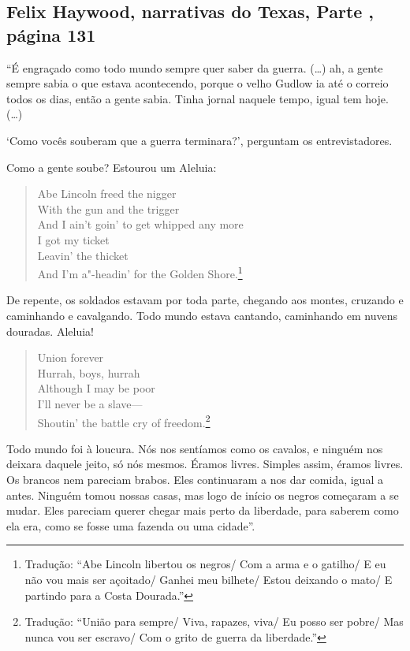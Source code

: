 \subsection{Felix Haywood, narrativas do Texas, Parte , página 131}
\label{ref134}

``É engraçado como todo mundo sempre quer saber da guerra. (\ldots{})
ah, a gente sempre sabia o que estava acontecendo, porque o velho Gudlow
ia até o correio todos os dias, então a gente sabia. Tinha jornal
naquele tempo, igual tem hoje. (\ldots{})

`Como vocês souberam que a guerra terminara?', perguntam os
entrevistadores.

Como a gente soube? Estourou um Aleluia:

\begin{verse}
Abe Lincoln freed the nigger\\
With the gun and the trigger\\
And I ain't goin' to get whipped any more\\
I got my ticket\\
Leavin' the thicket\\
And I'm a"-headin' for the Golden Shore.\footnote{Tradução: ``Abe Lincoln libertou os negros/ Com a arma e o gatilho/ E eu não vou mais ser
açoitado/ Ganhei meu bilhete/ Estou deixando o mato/ E partindo para a Costa
Dourada.''}
\end{verse}

De repente, os soldados estavam por toda parte, chegando aos montes,
cruzando e caminhando e cavalgando. Todo mundo estava cantando,
caminhando em nuvens douradas. Aleluia!

\begin{verse}
Union forever\\
Hurrah, boys, hurrah\\ 
Although I may be poor\\ 
I'll never be a slave---\\ 
Shoutin' the battle cry of freedom.\footnote{Tradução: ``União para sempre/ Viva, rapazes, viva/ Eu posso ser pobre/ Mas nunca vou ser escravo/ Com o grito de guerra da liberdade.''}
\end{verse}

Todo mundo foi à loucura. Nós nos sentíamos como os cavalos, e ninguém
nos deixara daquele jeito, só nós mesmos. Éramos livres. Simples assim,
éramos livres. Os brancos nem pareciam brabos. Eles continuaram a nos
dar comida, igual a antes. Ninguém tomou nossas casas, mas logo de
início os negros começaram a se mudar. Eles pareciam querer chegar mais
perto da liberdade, para saberem como ela era, como se fosse uma fazenda
ou uma cidade''.


